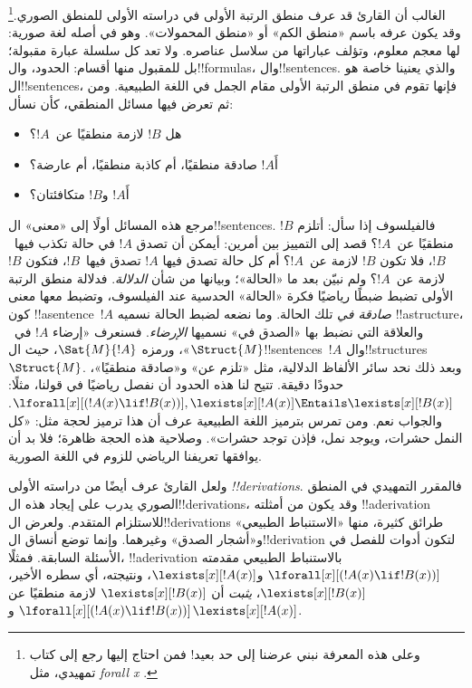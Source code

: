 \documentclass[../../../include/open-logic-section]{subfiles}
\begin{document}


الغالب أن القارئ قد عرف منطق الرتبة الأولى في دراسته الأولى للمنطق
الصوري.\footnote{وعلى هذه المعرفة نبني عرضنا إلى حد بعيد!{} فمن
  احتاج إليها رجع إلى كتاب تمهيدي، مثل \emph{forall x}
  \citep{Magnus2021}.} وقد يكون عرفه باسم «منطق الكم» أو «منطق
المحمولات». وهو في أصله لغة صورية: لها معجم معلوم، وتؤلف عباراتها
من سلاسل عناصره. ولا تعد كل سلسلة عبارة مقبولة؛ بل للمقبول منها
أقسام: الحدود، وال!!{formula}s، وال!!{sentence}s. والذي يعنينا
خاصة هو ال!!{sentence}s، فإنها تقوم في منطق الرتبة الأولى مقام
الجمل في اللغة الطبيعية. ومن ثم تعرض فيها مسائل المنطقي، كأن نسأل:
\begin{itemize}
    \item هل $!B$ لازمة منطقيًا عن~$!A$؟
    \item أَ$!A$ صادقة منطقيًا، أم كاذبة منطقيًا، أم عارضة؟
    \item أَ$!A$ و$!B$ متكافئتان؟
\end{itemize}

مرجع هذه المسائل أولًا إلى «معنى» ال!!{sentence}s. فالفيلسوف إذا
سأل: أتلزم $!B$ منطقيًا عن~$!A$؟ قصد إلى التمييز بين أمرين:
أيمكن أن تصدق $!A$ في حالة تكذب فيها~$!B$، فلا تكون $!B$ لازمة
عن~$!A$؟ أم كل حالة تصدق فيها $!A$ تصدق فيها~$!B$، فتكون $!B$
لازمة عن~$!A$؟ ولم نبيّن بعد ما «الحالة»؛ وبيانها من شأن
\emph{الدلالة}. فدلالة منطق الرتبة الأولى تضبط ضبطًا رياضيًا فكرة
«الحالة» الحدسية عند الفيلسوف، وتضبط معها معنى كون
!!a{sentence}~$!A$ \emph{صادقة في} تلك الحالة. وما نضعه لضبط
الحالة نسميه !!a{structure}، والعلاقة التي نضبط بها «الصدق في»
نسميها \emph{الإرضاء}. فسنعرف «إرضاء $!A$ في~$\Struct{M}$»،
ورمزه $\Sat{M}{!A}$، حيث ال!!{sentence}s~$!A$ وال!!{structure}s~$\Struct{M}$.
وبعد ذلك نحد سائر الألفاظ الدلالية، مثل «تلزم عن» و«صادقة
منطقيًا»، حدودًا دقيقة. تتيح لنا هذه الحدود أن نفصل رياضيًا في
قولنا، مثلًا:
$\lforall[x][(!A(x) \lif !B(x))],
\lexists[x][!A(x)] \Entails \lexists[x][!B(x)]$.
والجواب نعم. ومن تمرس بترميز اللغة الطبيعية عرف أن هذا ترميز لحجة
مثل: «كل النمل حشرات، ويوجد نمل، فإذن توجد حشرات». وصلاحية هذه
الحجة ظاهرة؛ فلا بد أن يوافقها تعريفنا الرياضي للزوم في اللغة
الصورية.

ولعل القارئ عرف أيضًا من دراسته الأولى \emph{!!{derivation}s}.
فالمقرر التمهيدي في المنطق الصوري يدرب على إيجاد هذه
ال!!{derivation}s، وقد يكون من أمثلته !!a{derivation} للاستلزام
المتقدم. ولعرض ال!!{derivation}s طرائق كثيرة، منها «الاستنباط
الطبيعي» و«أشجار الصدق» وغيرهما. وإنما توضع أنساق ال!!{derivation}
لتكون أدوات للفصل في الأسئلة السابقة. فمثلًا، !!a{derivation}
بالاستنباط الطبيعي مقدمته
$\lforall[x][(!A(x) \lif !B(x))]$ و$\lexists[x][!A(x)]$،
ونتيجته، أي سطره الأخير، $\lexists[x][!B(x)]$، \emph{يثبت} أن
$\lexists[x][!B(x)]$ لازمة منطقيًا عن
$\lforall[x][(!A(x) \lif !B(x))]$ و$\lexists[x][!A(x)]$.
\end{document}
